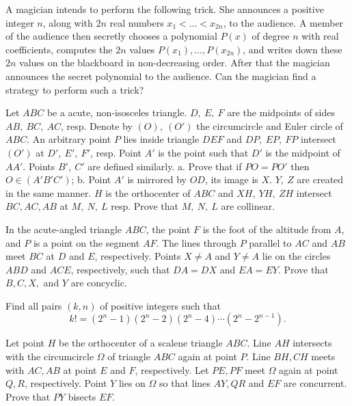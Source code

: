 \documentclass[11pt]{scrartcl}
\begin{document}
\begin{problem}[448881061747528]
A magician intends to perform the following trick. She announces a positive integer $n$, along with $2n$ real numbers $x_1 < \dots < x_{2n}$, to the audience. A member of the audience then secretly chooses a polynomial $P(x)$ of degree $n$ with real coefficients, computes the $2n$ values $P(x_1), \dots , P(x_{2n})$, and writes down these $2n$ values on the blackboard in non-decreasing order. After that the magician announces the secret polynomial to the audience. Can the magician find a strategy to perform such a trick?
\end{problem}
\begin{problem}[7220404010846068686]
	Let $ABC$ be a acute, non-isosceles triangle. $D,\ E,\ F$ are the midpoints of sides $AB,\ BC,\ AC$, resp. Denote by $(O),\ (O')$ the circumcircle and Euler circle of $ABC$. An arbitrary point $P$ lies inside triangle $DEF$ and $DP,\ EP,\ FP$ intersect $(O')$ at $D',\ E',\ F'$, resp. Point $A'$ is the point such that $D'$ is the midpoint of $AA'$. Points $B',\ C'$ are defined similarly.
a. Prove that if $PO=PO'$ then $O\in(A'B'C')$;
b. Point $A'$ is mirrored by $OD$, its image is $X$. $Y,\ Z$ are created in the same manner. $H$ is the orthocenter of $ABC$ and $XH,\ YH,\ ZH$ intersect $BC, AC, AB$ at $M,\ N,\ L$ resp. Prove that $M,\ N,\ L$ are collinear.
\end{problem}
\begin{problem}[5873161915777778529]
In the acute-angled triangle $ABC$, the point $F$ is the foot of the altitude from $A$, and $P$ is a point on the segment $AF$. The lines through $P$ parallel to $AC$ and $AB$ meet $BC$ at $D$ and $E$, respectively. Points $X \ne A$ and $Y \ne A$ lie on the circles $ABD$ and $ACE$, respectively, such that $DA = DX$ and $EA = EY$.
Prove that $B, C, X,$ and $Y$ are concyclic.
\end{problem}
\begin{problem}[16776483958513]
Find all pairs $(k,n)$ of positive integers such that\[ k!=(2^n-1)(2^n-2)(2^n-4)\cdots(2^n-2^{n-1}). \]
\end{problem}
\begin{problem}[844684477828422]
Let point $H$ be the orthocenter of a scalene triangle $ABC$. Line $AH$ intersects with the circumcircle $\Omega$ of triangle $ABC$ again at point $P$. Line $BH, CH$ meets with $AC,AB$ at point $E$ and $F$, respectively. Let $PE, PF$ meet $\Omega$ again at point $Q,R$, respectively. Point $Y$ lies on $\Omega$ so that lines $AY,QR$ and $EF$ are concurrent. Prove that $PY$ bisects $EF$.
\end{problem}
\end{document}
